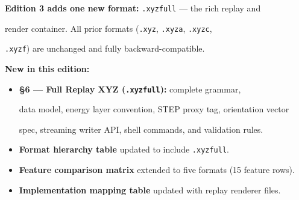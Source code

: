 \documentclass[12pt, a4paper, oneside]{article}
\begin{document}

\begin{tcolorbox}[

  enhanced, breakable=false,

  colback=revbluelight, colframe=revblue,

  boxrule=1.2pt, arc=4pt,

  title={\large\bfseries\color{white} What Is New in Edition 3 --- v4.1.0},

  attach boxed title to top left={yshift=-2mm, xshift=6mm},

  boxed title style={colback=revblue, colframe=revblue, arc=3pt},

  fonttitle=\bfseries, left=6pt, right=6pt, top=8pt, bottom=6pt

]


\textbf{Edition 3 adds one new format:} \texttt{.xyzfull} --- the rich replay and

render container.  All prior formats (\texttt{.xyz}, \texttt{.xyza}, \texttt{.xyzc},

\texttt{.xyzf}) are unchanged and fully backward-compatible.


\medskip

\begin{tcolorbox}[

  colback=white, colframe=rulegray,

  boxrule=0.6pt, arc=2pt, left=4pt, right=4pt, top=4pt, bottom=4pt

]

\textbf{New in this edition:}

\begin{itemize}

  \item \textbf{\S{}6 --- Full Replay XYZ (\texttt{.xyzfull}):}  complete grammar,

        data model, energy layer convention, STEP proxy tag, orientation vector

        spec, streaming writer API, shell commands, and validation rules.

  \item \textbf{Format hierarchy table} updated to include \texttt{.xyzfull}.

  \item \textbf{Feature comparison matrix} extended to five formats (15 feature rows).

  \item \textbf{Implementation mapping table} updated with replay renderer files.


\end{itemize}
\end{tcolorbox}
\end{tcolorbox}
\end{document}
